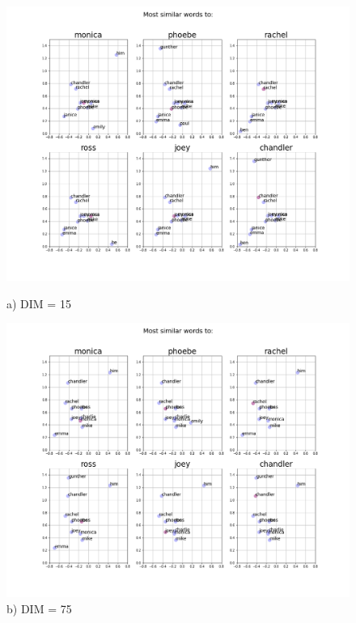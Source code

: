 \begin{figure}[H]

\centering
\begin{minipage}{0.47\textwidth}
\includegraphics[trim=4.2cm 3cm 3.7cm 2.7cm, clip=true, width=\textwidth]{results/embeddings/friends_similar_15.png}
\caption*{a) DIM = 15}
\end{minipage}\hfill
\begin{minipage}{0.47\textwidth}
\includegraphics[trim=4.2cm 3cm 3.7cm 2.7cm, clip=true, width=\textwidth]{results/embeddings/friends_similar_75.png}
\caption*{b) DIM = 75}
\end{minipage}\par

\end{figure}
